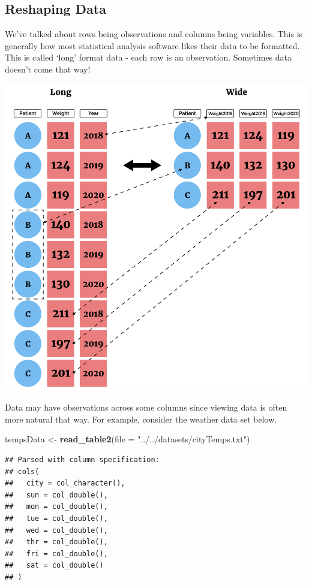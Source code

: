 \documentclass[
]{book}
\newenvironment{Shaded}{\begin{snugshade}}{\end{snugshade}}
\newcommand{\DataTypeTok}[1]{\textcolor[rgb]{0.13,0.29,0.53}{#1}}
\newcommand{\KeywordTok}[1]{\textcolor[rgb]{0.13,0.29,0.53}{\textbf{#1}}}
\newcommand{\NormalTok}[1]{#1}
\newcommand{\StringTok}[1]{\textcolor[rgb]{0.31,0.60,0.02}{#1}}
\theoremstyle{definition}
\theoremstyle{definition}
\theoremstyle{definition}
\theoremstyle{remark}
\begin{document}
\hypertarget{reshaping-data}{%
\subsection{Reshaping Data}\label{reshaping-data}}

We've talked about rows being observations and columns being variables. This is generally how most statistical analysis software likes their data to be formatted. This is called `long' format data - each row is an observation. Sometimes data doesn't come that way!

\begin{center}\includegraphics[width=0.7\linewidth]{img/longWideF} \end{center}

Data may have observations across some columns since viewing data is often more natural that way. For example, consider the weather data set below.

\begin{Shaded}
\begin{Highlighting}[]
\NormalTok{tempsData <-}\StringTok{ }\KeywordTok{read_table2}\NormalTok{(}\DataTypeTok{file =} \StringTok{"../../datasets/cityTemps.txt"}\NormalTok{)}
\end{Highlighting}
\end{Shaded}

\begin{verbatim}
## Parsed with column specification:
## cols(
##   city = col_character(),
##   sun = col_double(),
##   mon = col_double(),
##   tue = col_double(),
##   wed = col_double(),
##   thr = col_double(),
##   fri = col_double(),
##   sat = col_double()
## )
\end{verbatim}
\end{document}

